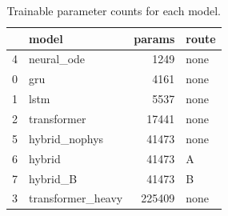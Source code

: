 \begin{table}
\caption{Trainable parameter counts for each model.}
\label{tab:model_parameter_counts}
\begin{tabular}{llrl}
\toprule
 & model & params & route \\
\midrule
4 & neural\_ode & 1249 & none \\
0 & gru & 4161 & none \\
1 & lstm & 5537 & none \\
2 & transformer & 17441 & none \\
5 & hybrid\_nophys & 41473 & none \\
6 & hybrid & 41473 & A \\
7 & hybrid\_B & 41473 & B \\
3 & transformer\_heavy & 225409 & none \\
\bottomrule
\end{tabular}
\end{table}
